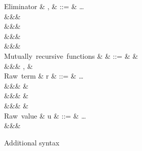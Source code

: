 \begin{figure}
\begin{syntaxfig}
\mbox{Eliminator}
&
\sigma, \tau
&
::=
&
\ldots
\\
&&&
\elimBoolTrue{\kappa}
\\
&&&
\elimBoolFalse{\kappa}
\\
&&&
\elimListSingleton{\branchNil{\kappa}}
\\
&&&
\elimListSingleton{\branchCons{\sigma}}
\\[2mm]
\mbox{Mutually recursive functions}
&
\delta
&
::=
&
\seqEmpty
&
\\
&&&
, \delta
&
\\[2mm]
\mbox{Raw term}
&
r
&
::=
&
\ldots
\\
&&&
\exLambda{\sigma}
&
\\
&&&
&
\\
&&&
&
\\[2mm]
\mbox{Raw value}
&
u
&
::=
&
\ldots
\\
&&&
\exClosureRecMutual{\rho}{\delta}{\sigma}
\end{syntaxfig}
\caption{Additional syntax}
\end{figure}
